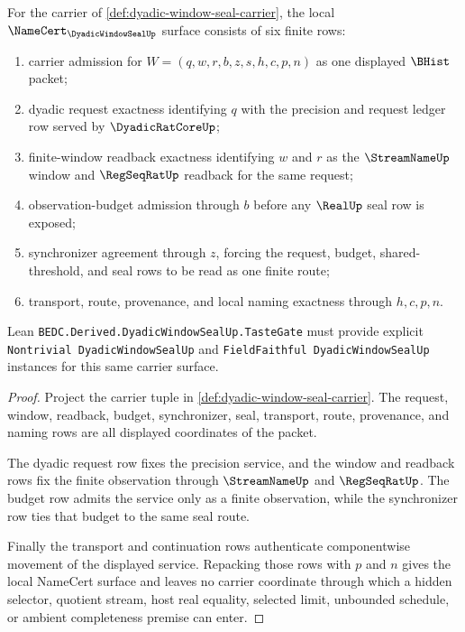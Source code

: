 \begin{theorem}
\label{thm:dyadic-window-seal-namecert-obligations}
For the carrier of \autoref{def:dyadic-window-seal-carrier}, the local $\NameCert_{\DyadicWindowSealUp}$ surface consists of six finite rows:
\begin{enumerate}
\item carrier admission for $W=(q,w,r,b,z,s,h,c,p,n)$ as one displayed $\BHist$ packet;
\item dyadic request exactness identifying $q$ with the precision and request ledger row served by $\DyadicRatCoreUp$;
\item finite-window readback exactness identifying $w$ and $r$ as the $\StreamNameUp$ window and $\RegSeqRatUp$ readback for the same request;
\item observation-budget admission through $b$ before any $\RealUp$ seal row is exposed;
\item synchronizer agreement through $z$, forcing the request, budget, shared-threshold, and seal rows to be read as one finite route;
\item transport, route, provenance, and local naming exactness through $h,c,p,n$.
\end{enumerate}
Lean \texttt{BEDC.Derived.DyadicWindowSealUp.TasteGate} must provide explicit \texttt{Nontrivial DyadicWindowSealUp} and \texttt{FieldFaithful DyadicWindowSealUp} instances for this same carrier surface.
\end{theorem}
\begin{proof}
Project the carrier tuple in \autoref{def:dyadic-window-seal-carrier}. The request, window, readback, budget, synchronizer, seal, transport, route, provenance, and naming rows are all displayed coordinates of the packet.

The dyadic request row fixes the precision service, and the window and readback rows fix the finite observation through $\StreamNameUp$ and $\RegSeqRatUp$. The budget row admits the service only as a finite observation, while the synchronizer row ties that budget to the same seal route.

Finally the transport and continuation rows authenticate componentwise movement of the displayed service. Repacking those rows with $p$ and $n$ gives the local NameCert surface and leaves no carrier coordinate through which a hidden selector, quotient stream, host real equality, selected limit, unbounded schedule, or ambient completeness premise can enter.
\end{proof}

